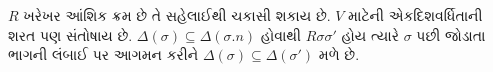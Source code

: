 \documentclass[../../../include/open-logic-section]{subfiles}
\begin{document}
$R$ ખરેખર આંશિક ક્રમ છે તે સહેલાઈથી ચકાસી શકાય છે.
$V$ માટેની એકદિશવર્ધિતાની શરત પણ સંતોષાય છે.
$\Delta(\sigma) \subseteq \Delta(\sigma.n)$ હોવાથી
$R\sigma\sigma'$ હોય ત્યારે $\sigma$ પછી જોડાતા ભાગની
લંબાઈ પર આગમન કરીને
$\Delta(\sigma) \subseteq \Delta(\sigma')$ મળે છે.
\end{document}
